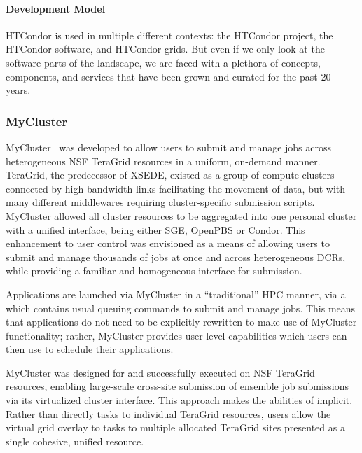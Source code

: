 \documentclass{sig-alternate}
\begin{document}
\paragraph{Development Model}

HTCondor is used in multiple different contexts: the HTCondor project, the
HTCondor software, and HTCondor grids. But even if we only look at the software
parts of the landscape, we are faced with a plethora of concepts, components,
and services that have been grown and curated for the past 20 years.

%
%
\subsubsection{MyCluster}
\label{sec:mycluster}

MyCluster~\cite{1652061,mycluster-clade,mycluster-cluster} was developed to allow users to submit and manage jobs
across heterogeneous NSF TeraGrid resources in a uniform, on-demand manner.
TeraGrid, the predecessor of XSEDE, existed as a group of compute clusters
connected by high-bandwidth links facilitating the movement of data, but with
many different middlewares requiring cluster-specific submission scripts.
MyCluster allowed all cluster resources to be aggregated into one personal
cluster with a unified interface, being either SGE, OpenPBS or Condor. This
enhancement to user control was envisioned as a means of allowing users to
submit and manage thousands of jobs at once and across heterogeneous DCRs, while
providing a familiar and homogeneous interface for submission.

Applications are launched via MyCluster in a ``traditional'' HPC manner, via a
 which contains usual queuing commands to submit
and manage jobs. This means that applications do not need to be explicitly
rewritten to make use of MyCluster functionality; rather, MyCluster provides
user-level \pilot capabilities which users can then use to schedule their
applications.

MyCluster was designed for and successfully executed on NSF TeraGrid resources,
enabling large-scale cross-site submission of ensemble job submissions via its
virtualized cluster interface. This approach makes the  abilities of \pilot implicit. Rather than directly 
tasks to individual TeraGrid resources, users allow the virtual grid overlay to
 tasks to multiple allocated TeraGrid sites presented as a
single cohesive, unified resource.
\end{document}
